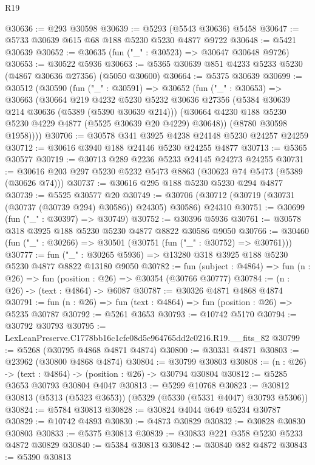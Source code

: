 \begin{lexlean}{R19}
\begin{coremodule}
@30636 := @293 @30598
@30639 := @5293 (@5543 @30636) @5458
@30647 := @5733 @30639 @615 @68 @188 @5230 @5230 @4877 @9722
@30648 := @5421 @30639
@30652 := @30635 (fun ("_" : @30523) => @30647 @30648 @9726)
@30653 := @30522 @5936
@30663 := @5365 @30639 @851 @4233 @5233 @5230 (@4867 @30636 @27356) (@5050 @30600)
@30664 := @5375 @30639
@30699 := @30512
    (@30590
      (fun ("_" : @30591) =>
      @30652
        (fun ("_" : @30653) =>
        @30663
          (@30664
            @219
            @4232
            @5230
            @5232
            @30636
            @27356
            (@5384 @30639 @214 @30636 (@5389 (@5390 @30639 @214)))
            (@30664 @4230 @188 @5230 @5230 @4229 @4877 (@5525 @30639 @20 @4229) @30648))
          (@8780 @30598 @1958))))
@30706 := @30578 @341 @3925 @4238 @24148 @5230 @24257 @24259
@30712 := @30616 @3940 @188 @24146 @5230 @24255 @4877
@30713 := @5365 @30577
@30719 := @30713 @289 @2236 @5233 @24145 @24273 @24255
@30731 := @30616 @203 @297 @5230 @5232 @5473 @8863 (@30623 @74 @5473 (@5389 (@30626 @74)))
@30737 := @30616 @295 @188 @5230 @5230 @294 @4877
@30739 := @5525 @30577 @20
@30749 := @30706 (@30712 (@30719 (@30731 (@30737 (@30739 @294) @30586)) @24305) @30586) @24310
@30751 := @30699 (fun ("_" : @30397) => @30749)
@30752 := @30396 @5936
@30761 := @30578 @318 @3925 @188 @5230 @5230 @4877 @8822 @30586 @9050
@30766 := @30460 (fun ("_" : @30266) => @30501 (@30751 (fun ("_" : @30752) => @30761)))
@30777 := fun ("_" : @30265 @5936) => @13280 @318 @3925 @188 @5230 @5230 @4877 @8822 @13180 @9050
@30782 := fun (subject : @4864) => fun (n : @26) => fun (position : @26) => @30354 (@30766 @30777)
@30784 := (n : @26) -> (text : @4864) -> @6087
@30787 := @30326 @4871 @4868 @4874
@30791 := fun (n : @26) => fun (text : @4864) => fun (position : @26) => @5235 @30787
@30792 := @5261 @3653
@30793 := @10742 @5170
@30794 := @30792 @30793
@30795 := LexLeanPreserve.C1778bb16c1cfe08d5e964765dd2c0216.R19.__fits_82
@30799 := @5268 (@30795 @4868 @4871 @4874)
@30800 := @30331 @4871
@30803 := @23962 (@30800 @4868 @4874)
@30804 := @30799 @30803
@30808 := (n : @26) -> (text : @4864) -> (position : @26) -> @30794 @30804
@30812 := @5285 @3653 @30793 @30804 @4047
@30813 := @5299 @10768
@30823 := @30812 @30813 (@5313 (@5323 @3653)) (@5329 (@5330 (@5331 @4047) @30793 @5306))
@30824 := @5784 @30813
@30828 := @30824 @4044 @649 @5234 @30787
@30829 := @10742 @4893
@30830 := @4873 @30829
@30832 := @30828 @30830 @30803
@30833 := @5375 @30813
@30839 := @30833 @221 @358 @5230 @5233 @4872 @30829
@30840 := @5384 @30813
@30842 := @30840 @82 @4872
@30843 := @5390 @30813

\end{coremodule}
\end{lexlean}

